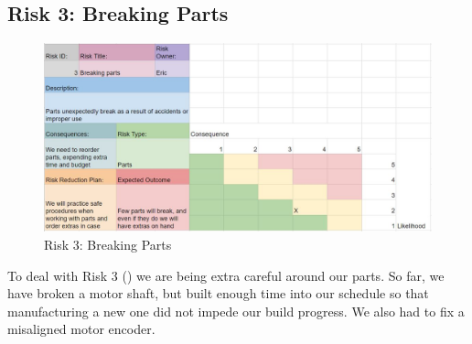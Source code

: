 \subsection{Risk 3: Breaking Parts}
\begin{figure}[!ht]
\centering
\includegraphics[width=0.98\columnwidth]{risks/risk3.JPG}
\caption{Risk 3: Breaking Parts}
\label{fig:risk3}
\end{figure}
To deal with Risk 3 () we are being extra careful around our parts. So far, we have broken a motor shaft, but built enough time into our schedule so that manufacturing a new one did not impede our build progress. We also had to fix a misaligned motor encoder.


